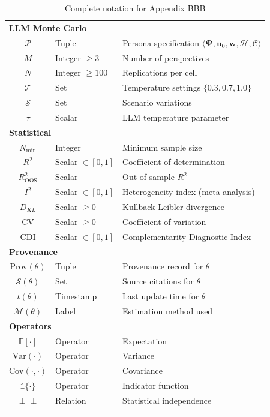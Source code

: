 \documentclass[11pt,a4paper]{article}
\theoremstyle{definition}
\begin{document}
\begin{longtable}{clp{8cm}}
\multicolumn{3}{l}{\textbf{LLM Monte Carlo}} \\
$\mathcal{P}$ & Tuple & Persona specification $\langle \boldsymbol{\Psi}, \mathbf{u}_0, \mathbf{w}, \mathcal{H}, \mathcal{C} \rangle$ \\
$M$ & Integer $\geq 3$ & Number of perspectives \\
$N$ & Integer $\geq 100$ & Replications per cell \\
$\mathcal{T}$ & Set & Temperature settings $\{0.3, 0.7, 1.0\}$ \\
$\mathcal{S}$ & Set & Scenario variations \\
$\tau$ & Scalar & LLM temperature parameter \\
\midrule

\multicolumn{3}{l}{\textbf{Statistical}} \\
$N_{\min}$ & Integer & Minimum sample size \\
$R^2$ & Scalar $\in [0,1]$ & Coefficient of determination \\
$R^2_{\text{OOS}}$ & Scalar & Out-of-sample $R^2$ \\
$I^2$ & Scalar $\in [0,1]$ & Heterogeneity index (meta-analysis) \\
$D_{KL}$ & Scalar $\geq 0$ & Kullback-Leibler divergence \\
CV & Scalar $\geq 0$ & Coefficient of variation \\
CDI & Scalar $\in [0,1]$ & Complementarity Diagnostic Index \\
\midrule

\multicolumn{3}{l}{\textbf{Provenance}} \\
Prov$(\theta)$ & Tuple & Provenance record for $\theta$ \\
$\mathcal{S}(\theta)$ & Set & Source citations for $\theta$ \\
$t(\theta)$ & Timestamp & Last update time for $\theta$ \\
$\mathcal{M}(\theta)$ & Label & Estimation method used \\
\midrule

\multicolumn{3}{l}{\textbf{Operators}} \\
$\mathbb{E}[\cdot]$ & Operator & Expectation \\
$\text{Var}(\cdot)$ & Operator & Variance \\
$\text{Cov}(\cdot, \cdot)$ & Operator & Covariance \\
$\mathbb{1}\{\cdot\}$ & Operator & Indicator function \\
$\perp\!\!\!\perp$ & Relation & Statistical independence \\
\bottomrule
\caption{Complete notation for Appendix BBB}
\label{tab:bbb-notation}
\end{longtable}
\end{document}
